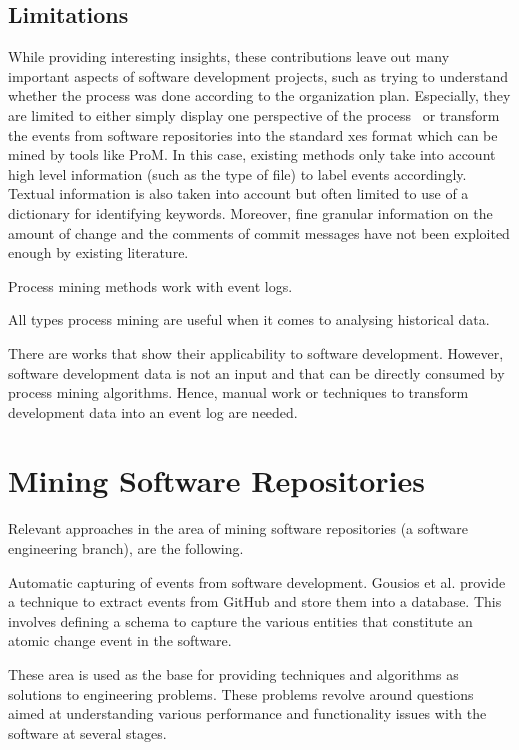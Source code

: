 \subsection{Limitations} 
While providing interesting insights, these contributions leave out many important aspects of software development projects, such as trying to understand whether the process was done according to the organization plan. Especially, they are limited to either simply display one perspective of the process~\citep{Song2007} or transform the events from software repositories into the standard \gls{xes} format which can be mined by tools like ProM. In this case, existing methods only take into account high level information (such as the type of file) to label events accordingly. Textual information is also taken into account \citep{rubin2007process} but often limited to use of a dictionary for identifying keywords. Moreover, fine granular information on the amount of change and the comments of commit messages have not been exploited enough by existing literature.


Process mining methods work with event logs. 

All types process mining are useful when it comes to analysing historical data. 

There are works that show their applicability to software development. However, software development data is not an input and that can be directly consumed by process mining algorithms. Hence, manual work or techniques to transform development data into an event log are needed. 

\section{Mining Software Repositories}
\label{sec:msr}






Relevant approaches in the area of mining software repositories (a software engineering branch), are the following.

Automatic capturing of events from software development. 
Gousios et al. provide a technique to extract events from GitHub and store them into a database. This involves defining a schema to capture the various entities that constitute an atomic change event in the software.

These area is used as the base for providing techniques and algorithms as solutions to engineering problems. These problems revolve around questions aimed at understanding various performance and functionality issues with the software at several stages. 


